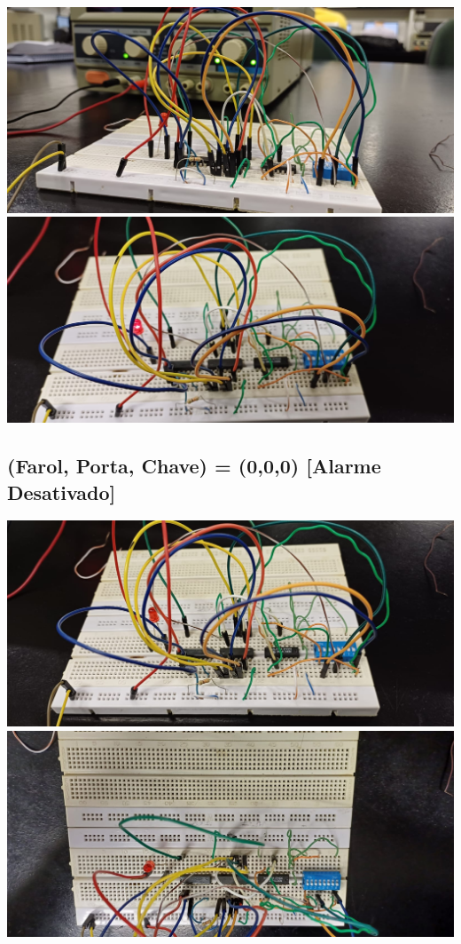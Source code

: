 \documentclass[]{article}
\begin{document}
			\includegraphics[scale=0.25]{Images/Protoboard Jumpers.jpeg} \\
			\includegraphics[scale=0.25]{Images/Protoboard Jumpers 2.jpeg} \\
		\subsection{(Farol, Porta, Chave) = (0,0,0) [Alarme Desativado]}
			\includegraphics[scale=0.25]{Images/Protoboard 000 Down.jpeg} \\
			\includegraphics[scale=0.25]{Images/Protoboard 000 Top.jpeg} \\
\end{document}
